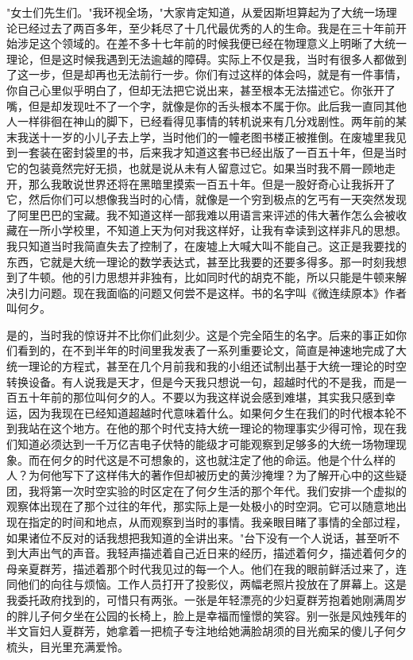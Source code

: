 \documentclass[UTF8]{ctexart}
\begin{document}
"女士们先生们。"我环视全场，"大家肯定知道，从爱因斯坦算起为了大统一场理论已经过去了两百多年，至少耗尽了十几代最优秀的人的生命。我是在三十年前开始涉足这个领域的。在差不多十七年前的时候我便已经在物理意义上明晰了大统一理论，但是这时候我遇到无法逾越的障碍。实际上不仅是我，当时有很多人都做到了这一步，但是却再也无法前行一步。你们有过这样的体会吗，就是有一件事情，你自己心里似乎明白了，但却无法把它说出来，甚至根本无法描述它。你张开了嘴，但是却发现吐不了一个字，就像是你的舌头根本不属于你。此后我一直同其他人一样徘徊在神山的脚下，已经看得见事情的转机说来有几分戏剧性。两年前的某末我送十一岁的小儿子去上学，当时他们的一幢老图书楼正被推倒。在废墟里我见到一套装在密封袋里的书，后来我才知道这套书已经出版了一百五十年，但是当时它的包装竟然完好无损，也就是说从未有人留意过它。如果当时我不屑一顾地走开，那么我敢说世界还将在黑暗里摸索一百五十年。但是一股好奇心让我拆开了它，然后你们可以想像我当时的心情，就像是一个穷到极点的乞丐有一天突然发现了阿里巴巴的宝藏。我不知道这样一部我难以用语言来评述的伟大著作怎么会被收藏在一所小学校里，不知道上天为何对我这样好，让我有幸读到这样非凡的思想。我只知道当时我简直失去了控制了，在废墟上大喊大叫不能自己。这正是我要找的东西，它就是大统一理论的数学表达式，甚至比我要的还要多得多。那一时刻我想到了牛顿。他的引力思想并非独有，比如同时代的胡克不能，所以只能是牛顿来解决引力问题。现在我面临的问题又何尝不是这样。书的名字叫《微连续原本》作者叫何夕。

是的，当时我的惊讶并不比你们此刻少。这是个完全陌生的名字。后来的事正如你们看到的，在不到半年的时间里我发表了一系列重要论文，简直是神速地完成了大统一理论的方程式，甚至在几个月前我和我的小组还试制出基于大统一理论的时空转换设备。有人说我是天才，但是今天我只想说一句，超越时代的不是我，而是一百五十年前的那位叫何夕的人。不要以为我这样说会感到难堪，其实我只感到幸运，因为我现在已经知道超越时代意味着什么。如果何夕生在我们的时代根本轮不到我站在这个地方。在他的那个时代支持大统一理论的物理事实少得可怜，现在我们知道必须达到一千万亿吉电子伏特的能级才可能观察到足够多的大统一场物理现象。而在何夕的时代这是不可想象的，这也就注定了他的命运。他是个什么样的人？为何他写下了这样伟大的著作但却被历史的黄沙掩埋？为了解开心中的这些疑团，我将第一次时空实验的时区定在了何夕生活的那个年代。我们安排一个虚拟的观察体出现在了那个过往的年代，那实际上是一处极小的时空洞。它可以随意地出现在指定的时间和地点，从而观察到当时的事情。我亲眼目睹了事情的全部过程，如果诸位不反对的话我想把我知道的全讲出来。"台下没有一个人说话，甚至听不到大声出气的声音。我轻声描述着自己近日来的经历，描述着何夕，描述着何夕的母亲夏群芳，描述着那个时代我见过的每一个人。他们在我的眼前鲜活过来了，连同他们的向往与烦恼。工作人员打开了投影仪，两幅老照片投放在了屏幕上。这是我委托政府找到的，可惜只有两张。一张是年轻漂亮的少妇夏群芳抱着她刚满周岁的胖儿子何夕坐在公园的长椅上，脸上是幸福而憧憬的笑容。别一张是风烛残年的半文盲妇人夏群芳，她拿着一把梳子专注地给她满脸胡须的目光痴呆的傻儿子何夕梳头，目光里充满爱怜。
\end{document}
